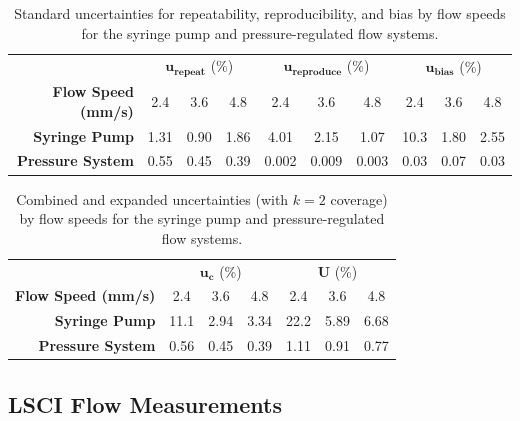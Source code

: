 \documentclass[12pt]{spieman}
\begin{document}
\begin{spacing}{2}
\begin{table}
    \caption {
        Standard uncertainties for repeatability, reproducibility, and bias by flow speeds for the syringe pump and pressure-regulated flow systems.
    }
    \label{tab:uncertainty_standard}
    \centering
    \begin{tabular}{rccccccccc}
        \addlinespace
        \toprule
            &
            \multicolumn{3}{c}{$\boldsymbol{u_\textbf{repeat}}$ (\%)}       & 
            \multicolumn{3}{c}{$\boldsymbol{u_\textbf{reproduce}}$ (\%)}    & 
            \multicolumn{3}{c}{$\boldsymbol{u_\textbf{bias}}$ (\%)}         \\
            \cmidrule(lr){2-4}
            \cmidrule(lr){5-7}
            \cmidrule(lr){8-10}
        \textbf{Flow Speed (mm/s)} & 2.4    & 3.6   & 4.8   & 2.4   & 3.6   & 4.8   & 2.4   & 3.6   & 4.8   \\
        \midrule
        \textbf{Syringe Pump}      & 1.31   & 0.90  & 1.86  & 4.01  & 2.15  & 1.07  & 10.3  & 1.80  & 2.55  \\
        \textbf{Pressure System}   & 0.55   & 0.45  & 0.39  & 0.002 & 0.009 & 0.003 & 0.03  & 0.07  & 0.03  \\
        \bottomrule
    \end{tabular}
\end{table}

\begin{table}
    \caption {
        Combined and expanded uncertainties (with $k=2$ coverage) by flow speeds for the syringe pump and pressure-regulated flow systems.
    }
    \label{tab:uncertainty_combined}
    \centering
    \begin{tabular}{rcccccc}
        \addlinespace
        \toprule
            &
            \multicolumn{3}{c}{$\boldsymbol{u_c}$ (\%)}     &
            \multicolumn{3}{c}{$\boldsymbol{U}$ (\%)}       \\
            \cmidrule(lr){2-4}
            \cmidrule(lr){5-7}
        \textbf{Flow Speed (mm/s)} & 2.4    & 3.6   & 4.8   & 2.4   & 3.6   & 4.8   \\
        \midrule
        \textbf{Syringe Pump}      & 11.1   & 2.94  & 3.34  & 22.2  & 5.89  & 6.68  \\
        \textbf{Pressure System}   & 0.56   & 0.45  & 0.39  & 1.11  & 0.91  & 0.77  \\
        \bottomrule
    \end{tabular}
\end{table}


\subsection{LSCI Flow Measurements}


\end{spacing}
\end{document}
